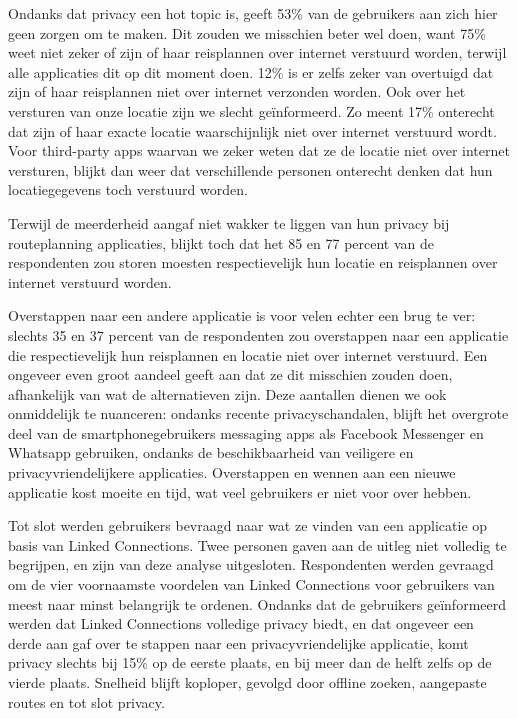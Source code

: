 Ondanks dat privacy een hot topic is, geeft 53\% van de gebruikers aan zich hier geen zorgen om te maken. Dit zouden we misschien beter wel doen, want 75\% weet niet zeker of zijn of haar reisplannen over internet verstuurd worden, terwijl alle applicaties dit op dit moment doen. 12\% is er zelfs zeker van overtuigd dat zijn of haar reisplannen niet over internet verzonden worden. Ook over het versturen van onze locatie zijn we slecht geïnformeerd. Zo meent 17\% onterecht dat zijn of haar exacte locatie waarschijnlijk niet over internet verstuurd wordt. Voor third-party apps waarvan we zeker weten dat ze de locatie niet over internet versturen, blijkt dan weer dat verschillende personen onterecht denken dat hun locatiegegevens toch verstuurd worden. 

Terwijl de meerderheid aangaf niet wakker te liggen van hun privacy bij routeplanning applicaties, blijkt toch dat het 85 en 77 percent van de respondenten zou storen moesten respectievelijk hun locatie en reisplannen over internet verstuurd worden.
 
Overstappen naar een andere applicatie is voor velen echter een brug te ver: slechts 35 en 37 percent van de respondenten zou overstappen naar een applicatie die respectievelijk hun reisplannen en locatie niet over internet verstuurd. Een ongeveer even groot aandeel geeft aan dat ze dit misschien zouden doen, afhankelijk van wat de alternatieven zijn. Deze aantallen dienen we ook onmiddelijk te nuanceren: ondanks recente privacyschandalen, blijft het overgrote deel van de smartphonegebruikers messaging apps als Facebook Messenger en Whatsapp gebruiken, ondanks de beschikbaarheid van veiligere en privacyvriendelijkere applicaties. Overstappen en wennen aan een nieuwe applicatie kost moeite en tijd, wat veel gebruikers er niet voor over hebben.

Tot slot werden gebruikers bevraagd naar wat ze vinden van een applicatie op basis van Linked Connections. Twee personen gaven aan de uitleg niet volledig te begrijpen, en zijn van deze analyse uitgesloten.
Respondenten werden gevraagd om de vier voornaamste voordelen van Linked Connections voor gebruikers van meest naar minst belangrijk te ordenen. Ondanks dat de gebruikers geïnformeerd werden dat Linked Connections volledige privacy biedt, en dat ongeveer een derde aan gaf over te stappen naar een privacyvriendelijke applicatie, komt privacy slechts bij 15\% op de eerste plaats, en bij meer dan de helft zelfs op de vierde plaats. Snelheid blijft koploper, gevolgd door offline zoeken, aangepaste routes en tot slot privacy.


